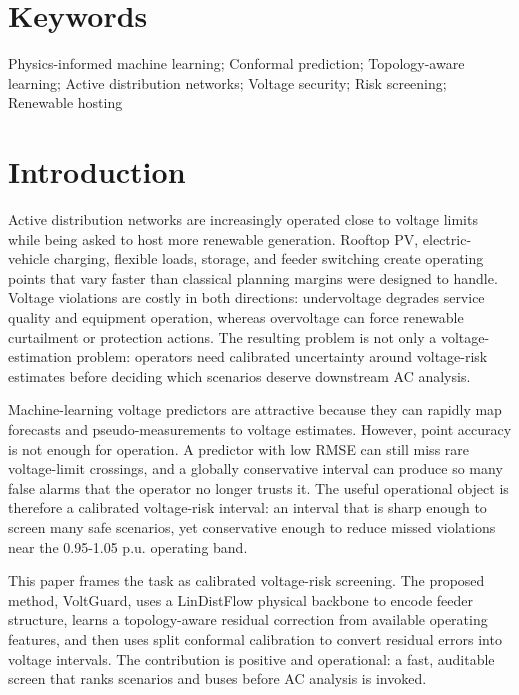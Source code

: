 \documentclass[
  preprint,12pt]{elsarticle}
\begin{document}
\section*{Keywords}\label{keywords}

Physics-informed machine learning; Conformal prediction; Topology-aware
learning; Active distribution networks; Voltage security; Risk
screening; Renewable hosting

\section{Introduction}\label{introduction}

Active distribution networks are increasingly operated close to voltage
limits while being asked to host more renewable generation. Rooftop PV,
electric-vehicle charging, flexible loads, storage, and feeder switching
create operating points that vary faster than classical planning margins
were designed to handle. Voltage violations are costly in both
directions: undervoltage degrades service quality and equipment
operation, whereas overvoltage can force renewable curtailment or
protection actions. The resulting problem is not only a
voltage-estimation problem: operators need calibrated uncertainty around
voltage-risk estimates before deciding which scenarios deserve
downstream AC analysis.

Machine-learning voltage predictors are attractive because they can
rapidly map forecasts and pseudo-measurements to voltage estimates.
However, point accuracy is not enough for operation. A predictor with
low RMSE can still miss rare voltage-limit crossings, and a globally
conservative interval can produce so many false alarms that the operator
no longer trusts it. The useful operational object is therefore a
calibrated voltage-risk interval: an interval that is sharp enough to
screen many safe scenarios, yet conservative enough to reduce missed
violations near the 0.95-1.05 p.u. operating band.

This paper frames the task as calibrated voltage-risk screening. The
proposed method, VoltGuard, uses a LinDistFlow physical backbone to
encode feeder structure, learns a topology-aware residual correction
from available operating features, and then uses split conformal
calibration to convert residual errors into voltage intervals. The
contribution is positive and operational: a fast, auditable screen that
ranks scenarios and buses before AC analysis is invoked.
\end{document}
